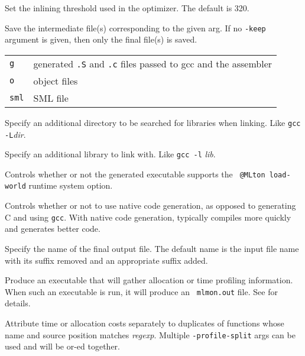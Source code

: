 \begin{description}

Set the inlining threshold used in the optimizer.  The default is 320.


Save the intermediate file(s) corresponding to the given arg.  If
no {\tt -keep} argument is given, then only the final file(s) is saved.\\
\begin{tabular}{ll}
{\tt g} & generated {\tt .S} and {\tt .c} files passed to gcc and the assembler\\
{\tt o} & object files\\
{\tt sml} & SML file\\
\end{tabular}

Specify an additional directory to be searched for libraries when
linking.  Like {\tt gcc -L}{\it dir}.

Specify an additional library to link with.  Like {\tt gcc -l}{\it
lib}.

Controls whether or not the generated executable supports the {\tt
@MLton load-world} runtime system option.

Controls whether or not to use native code generation, as opposed to
generating C and using {\tt gcc}.  With native code generation,
{\mlton} typically compiles more quickly and generates better code.

Specify the name of the final output file. The default name is the
input file name with its suffix removed and an appropriate suffix
added.

Produce an executable that will gather allocation or time profiling
information.  When such an executable is run, it will produce an {\tt
mlmon.out} file.  See  for details.

Attribute time or allocation costs separately to duplicates of
functions whose name and source position matches {\it regexp}.
Multiple {\tt -profile-split} args can be used and will be or-ed
together.


\end{description}
